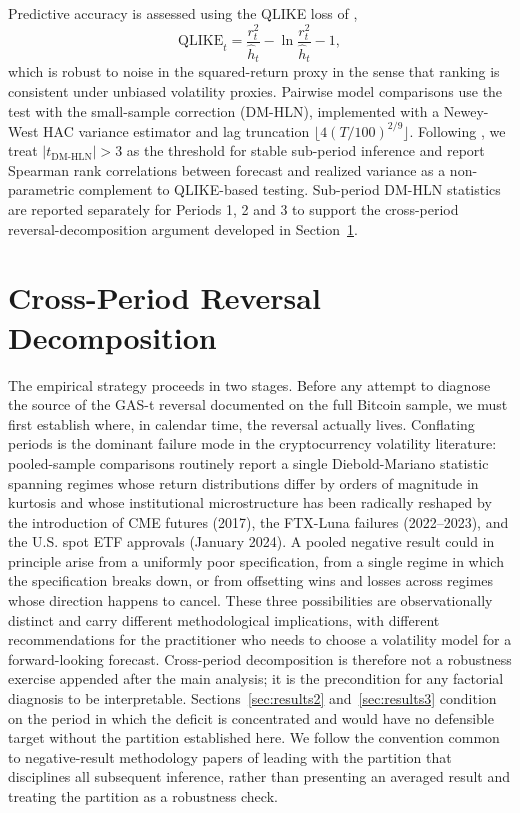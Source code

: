 Predictive accuracy is assessed using the QLIKE loss of \citet{patton2011},
\begin{equation}
\mathrm{QLIKE}_t = \frac{r_t^2}{\hat h_t} - \ln\!\frac{r_t^2}{\hat h_t} - 1,
\end{equation}
which is robust to noise in the squared-return proxy in the sense that ranking is consistent under unbiased volatility proxies. Pairwise model comparisons use the \citet{diebold1995} test with the \citet{harvey1997} small-sample correction (DM-HLN), implemented with a Newey-West \citep{newey1987} HAC variance estimator and lag truncation $\lfloor 4 (T/100)^{2/9} \rfloor$. Following \citet{harvey2016}, we treat $|t_{\mathrm{DM\text{-}HLN}}| > 3$ as the threshold for stable sub-period inference and report Spearman rank correlations between forecast and realized variance as a non-parametric complement to QLIKE-based testing. Sub-period DM-HLN statistics are reported separately for Periods 1, 2 and 3 to support the cross-period reversal-decomposition argument developed in Section~\ref{sec:results1}.

\section{Cross-Period Reversal Decomposition}
\label{sec:results1}

The empirical strategy proceeds in two stages. Before any attempt to diagnose the source of the GAS-t reversal documented on the full Bitcoin sample, we must first establish where, in calendar time, the reversal actually lives. Conflating periods is the dominant failure mode in the cryptocurrency volatility literature: pooled-sample comparisons routinely report a single Diebold-Mariano statistic spanning regimes whose return distributions differ by orders of magnitude in kurtosis and whose institutional microstructure has been radically reshaped by the introduction of CME futures (2017), the FTX-Luna failures (2022--2023), and the U.S. spot ETF approvals (January 2024). A pooled negative result could in principle arise from a uniformly poor specification, from a single regime in which the specification breaks down, or from offsetting wins and losses across regimes whose direction happens to cancel. These three possibilities are observationally distinct and carry different methodological implications, with different recommendations for the practitioner who needs to choose a volatility model for a forward-looking forecast. Cross-period decomposition is therefore not a robustness exercise appended after the main analysis; it is the precondition for any factorial diagnosis to be interpretable. Sections~\ref{sec:results2} and~\ref{sec:results3} condition on the period in which the deficit is concentrated and would have no defensible target without the partition established here. We follow the convention common to negative-result methodology papers \citep{welch2008,harvey2016} of leading with the partition that disciplines all subsequent inference, rather than presenting an averaged result and treating the partition as a robustness check.

